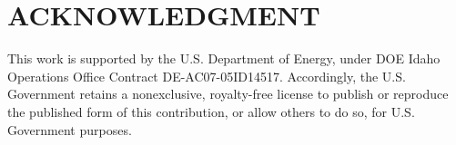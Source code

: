 \documentclass{mc2013}
\begin{document}
\section*{ACKNOWLEDGMENT}
This work is supported by the U.S. Department of Energy, under DOE Idaho Operations Office Contract DE-AC07-05ID14517. Accordingly, the U.S. Government retains a nonexclusive, royalty-free license to publish or reproduce the published form of this contribution, or allow others to do so, for U.S. Government purposes.



\end{document}

